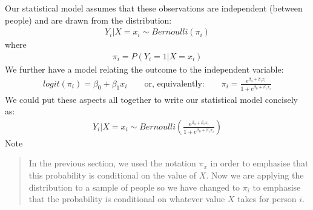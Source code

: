 \documentclass[letterpaper,10pt,english]{jupyterBook}
\begin{document}
\sphinxAtStartPar
{} Our statistical model assumes that these observations are independent (between people) and are drawn from the distribution:
\begin{equation*}
\begin{split}
Y_i | X=x_i \sim Bernoulli(\pi_i)
\end{split}
\end{equation*}
\sphinxAtStartPar
where
\begin{equation*}
\begin{split}
\pi_i = P(Y_i=1 | X=x_i)
\end{split}
\end{equation*}
\sphinxAtStartPar
We further have a model relating the outcome to the independent variable:
\begin{equation*}
\begin{split}
logit(\pi_i) = \beta_0 + \beta_1 x_i \qquad \text{or, equivalently:} \qquad \pi_i = \frac{e^{\beta_0 + \beta_1 x_i}}{1 + e^{\beta_0 + \beta_1 x_i}}
\end{split}
\end{equation*}
\sphinxAtStartPar
We could put these aspects all together to write our statistical model concisely as:
\begin{equation*}
\begin{split}
Y_i | X=x_i \sim Bernoulli\left(  \frac{e^{\beta_0 + \beta_1 x_i}}{1 + e^{\beta_0 + \beta_1 x_i}} \right)
\end{split}
\end{equation*}
\sphinxAtStartPar
Note
\begin{quote}

\sphinxAtStartPar
In the previous section, we used the notation \(\pi_x\) in order to emphasise that this probability is conditional on the value of \(X\). Now we are applying the distribution to a sample of people so we have changed to \(\pi_i\) to emphasise that the probability is conditional on whatever value \(X\) takes for person \(i\).
\end{quote}
\end{document}
